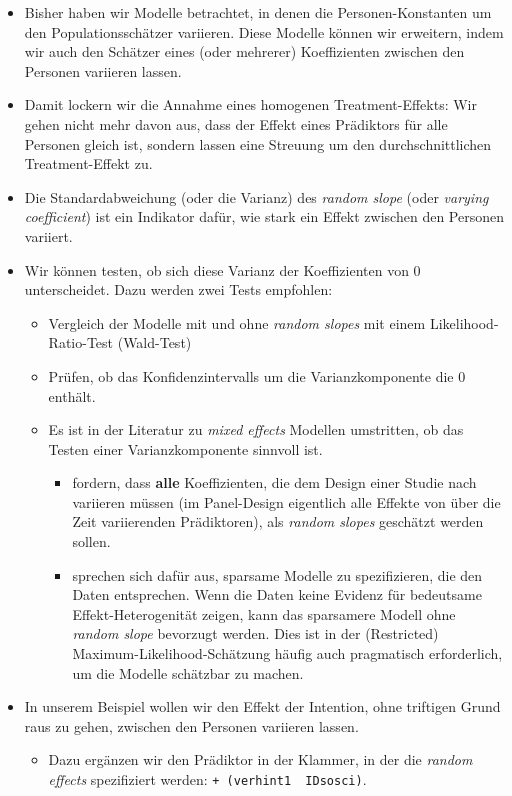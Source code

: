 \documentclass[
]{book}
\providecommand{\tightlist}{%
  \setlength{\itemsep}{0pt}\setlength{\parskip}{0pt}}
\begin{document}
\begin{itemize}
\tightlist
\item
  Bisher haben wir Modelle betrachtet, in denen die Personen-Konstanten um den Populationsschätzer variieren. Diese Modelle können wir erweitern, indem wir auch den Schätzer eines (oder mehrerer) Koeffizienten zwischen den Personen variieren lassen.
\item
  Damit lockern wir die Annahme eines homogenen Treatment-Effekts: Wir gehen nicht mehr davon aus, dass der Effekt eines Prädiktors für alle Personen gleich ist, sondern lassen eine Streuung um den durchschnittlichen Treatment-Effekt zu.
\item
  Die Standardabweichung (oder die Varianz) des \emph{random slope} (oder \emph{varying coefficient}) ist ein Indikator dafür, wie stark ein Effekt zwischen den Personen variiert.
\item
  Wir können testen, ob sich diese Varianz der Koeffizienten von 0 unterscheidet. Dazu werden zwei Tests empfohlen:

  \begin{itemize}
  \tightlist
  \item
    Vergleich der Modelle mit und ohne \emph{random slopes} mit einem Likelihood-Ratio-Test (Wald-Test)
  \item
    Prüfen, ob das Konfidenzintervalls um die Varianzkomponente die 0 enthält.
  \item
    Es ist in der Literatur zu \emph{mixed effects} Modellen umstritten, ob das Testen einer Varianzkomponente sinnvoll ist.

    \begin{itemize}
    \tightlist
    \item
      \citet{barrRandomEffectsStructure2013} fordern, dass \textbf{alle} Koeffizienten, die dem Design einer Studie nach variieren müssen (im Panel-Design eigentlich alle Effekte von über die Zeit variierenden Prädiktoren), als \emph{random slopes} geschätzt werden sollen.
    \item
      \citet{matuschekBalancingTypeError2017} sprechen sich dafür aus, sparsame Modelle zu spezifizieren, die den Daten entsprechen. Wenn die Daten keine Evidenz für bedeutsame Effekt-Heterogenität zeigen, kann das sparsamere Modell ohne \emph{random slope} bevorzugt werden. Dies ist in der (Restricted) Maximum-Likelihood-Schätzung häufig auch pragmatisch erforderlich, um die Modelle schätzbar zu machen.
    \end{itemize}
  \end{itemize}
\item
  In unserem Beispiel wollen wir den Effekt der Intention, ohne triftigen Grund raus zu gehen, zwischen den Personen variieren lassen.

  \begin{itemize}
  \tightlist
  \item
    Dazu ergänzen wir den Prädiktor in der Klammer, in der die \emph{random effects} spezifiziert werden: \texttt{+\ (verhint1\ \textbar{}\ IDsosci)}.
  \end{itemize}
\end{itemize}
\end{document}
